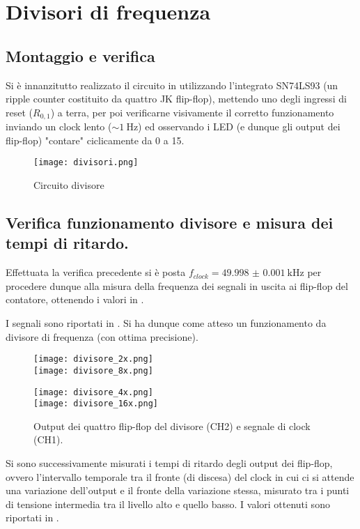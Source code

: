 \section{Divisori di frequenza}
\subsection{Montaggio e verifica}
Si è innanzitutto realizzato il circuito in  utilizzando l'integrato SN74LS93 (un ripple counter costituito da quattro JK flip-flop), mettendo uno degli ingressi di reset ($R_{0,1}$) a terra, per poi verificarne visivamente il corretto funzionamento inviando un clock lento ($\sim \SI{1}{\Hz}$) ed osservando i LED (e dunque gli output dei flip-flop) "contare" ciclicamente da 0 a 15.

\begin{figure}[h]
	\centering
	\texttt{[image: divisori.png]}
	\caption{Circuito divisore}
	\label{fig:div}
\end{figure}

\subsection{Verifica funzionamento divisore e misura dei tempi di ritardo.}
Effettuata la verifica precedente si è posta $f_{clock} = \SI{49.998(1)}{ \kilo \hertz}$ per procedere dunque alla misura della frequenza dei segnali in uscita ai flip-flop del contatore, ottenendo i valori in .

I segnali sono riportati in . Si ha dunque come atteso un funzionamento da divisore di frequenza (con ottima precisione).

\begin{figure}[h]
	\centering
	\begin{minipage}{0.47\textwidth}
		\texttt{[image: divisore\_2x.png]}
		\\
		\texttt{[image: divisore\_8x.png]}
	\end{minipage}
	\begin{minipage}{0.47\textwidth}
		\texttt{[image: divisore\_4x.png]}
		\\
		\texttt{[image: divisore\_16x.png]}
	\end{minipage}
	\caption{Output dei quattro flip-flop del divisore (CH2) e segnale di clock (CH1).}
	\label{fig:divout}
\end{figure}

Si sono successivamente misurati i tempi di ritardo degli output dei flip-flop, ovvero l'intervallo temporale tra il fronte (di discesa) del clock in cui ci si attende una variazione dell'output e il fronte della variazione stessa, misurato tra i punti di tensione intermedia tra il livello alto e quello basso. I valori ottenuti sono riportati in .

